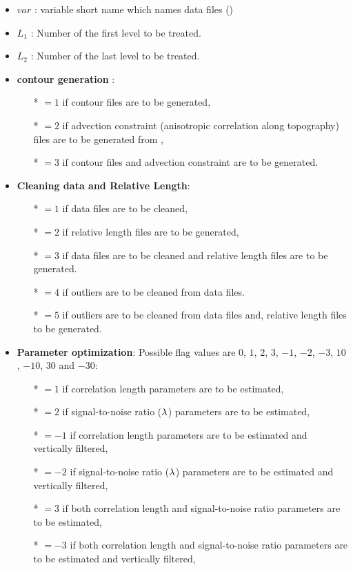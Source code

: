 \begin{itemize}
\item $var$ :  variable short name which names data files ()
\item $L_1$ :  Number of the first level to be treated. 
\item $L_2$ :  Number of the last level to be treated.
\item {\bf contour generation} : 
              \begin{itemize}
                \item[*] $=1$ if contour files are to be generated,
                \item[*] $=2$ if advection constraint (anisotropic correlation along topography) files are to be generated from ,
                \item[*] $=3$ if contour files and advection constraint are to be generated.
              \end{itemize}
\item {\bf Cleaning data and Relative Length}: 
              \begin{itemize}
                \item[*] $=1$ if data files are to be cleaned,
                \item[*] $=2$ if relative length files are to be generated,
                \item[*] $=3$ if data files are to be cleaned and relative length files are to be generated.
                \item[*] $=4$ if outliers are to be cleaned from data files.
                \item[*] $=5$ if outliers are to be cleaned from data files and, relative length files to be generated.
              \end{itemize}


\item {\bf Parameter optimization}: Possible flag values are $0$, $1$, $2$, $3$, $-1$, $-2$, $-3$, $10$, $-10$, $30$ and $-30$:
              \begin{itemize}
                \item[*] $=1$ if correlation length parameters are to be estimated,
                \item[*] $=2$ if signal-to-noise ratio ($\lambda$) parameters are to be estimated,
                \item[*] $=-1$ if correlation length parameters are to be estimated and vertically filtered,
                \item[*] $=-2$ if signal-to-noise ratio ($\lambda$) parameters are to be estimated and vertically filtered,
                \item[*] $=3$ if both  correlation length and  signal-to-noise ratio parameters are to be estimated,
                \item[*] $=-3$ if both  correlation length and  signal-to-noise ratio parameters are to be estimated and vertically filtered,


\end{itemize}
\end{itemize}
